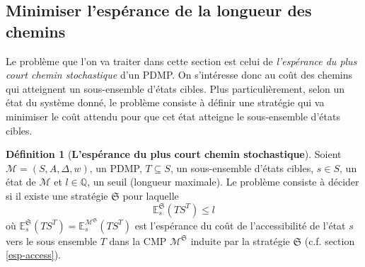 \documentclass[12pt,a4paper]{report}
\theoremstyle{definition}%
\newtheorem{definition}{Définition}[chapter]
\theoremstyle{remark}
\begin{document}
\subsection{Minimiser l'espérance de la longueur des chemins}
	Le problème que l'on va traiter dans cette section est celui de
	\textit{l'espérance du plus court chemin stochastique} d'un PDMP.
	On s'intéresse donc au coût des chemins qui atteignent un sous-ensemble
	d'états cibles.
	Plus particulièrement, selon un état du système donné, le problème consiste
	à définir une stratégie qui va minimiser le coût attendu pour que cet état
	atteigne le sous-ensemble d'états cibles.

	\begin{definition}[\textbf{L'espérance du plus court chemin stochastique}]
		Soient $\mathcal{M} = (S, A, \Delta, w)$, un PDMP, $T \subseteq S$, un
		sous-ensemble d'états cibles, $s \in S$, un état de $\mathcal{M}$ et
		$l \in \mathbb{Q}$, un seuil (longueur maximale).
		Le problème consiste à décider si il existe une
		stratégie $\mathfrak{S}$ pour laquelle
		\[\mathbb{E}^{\mathfrak{S}}_s (TS^T)\leq l\] où
		$\mathbb{E}^\mathfrak{S}_s(TS^T) = \mathbb{E}^{\mathcal{M}^\mathfrak{S}}_s(TS^T)$ est
		l'espérance du coût de l'accessibilité de l'état $s$ vers le sous ensemble $T$
		dans la CMP $\mathcal{M}^\mathfrak{S}$ induite par la stratégie
		$\mathfrak{S}$ (c.f. section \ref{esp-access}).
	\end{definition}
\end{document}
